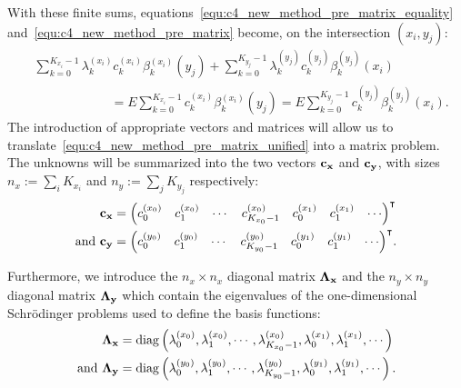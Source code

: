 With these finite sums, equations~\eqref{equ:c4_new_method_pre_matrix_equality} and~\eqref{equ:c4_new_method_pre_matrix} become, on the intersection $(x_i, y_j)$:
\begin{align}
     & \sum_{k=0}^{K_{x_i}-1} \lambda_k^{(x_i)} c_k^{(x_i)} \beta^{(x_i)}_k(y_j) + \sum_{k=0}^{K_{y_j}-1} \lambda_k^{(y_j)} c_k^{(y_j)} \beta_k^{(y_j)}(x_i)\nonumber                                  \\
     & \qquad\qquad\qquad     = E \sum_{k=0}^{K_{x_i}-1} c_k^{(x_i)} \beta_k^{(x_i)}(y_j) = E \sum_{k=0}^{K_{y_j}-1} c_k^{(y_j)} \beta_k^{(y_j)}(x_i) \text{.}\label{equ:c4_new_method_pre_matrix_unified}
\end{align}
The introduction of appropriate vectors and matrices will allow us to translate~\eqref{equ:c4_new_method_pre_matrix_unified} into a matrix problem. The unknowns will be summarized into the two vectors $\vb{c_x}$ and $\vb{c_y}$, with sizes $n_x := \sum_i K_{x_i}$ and $n_y := \sum_j K_{y_j}$ respectively:
\begin{align*}
    \vb{c_x}            & = {\begin{pmatrix} c_0^{(x_0)} & c_1^{(x_0)} & \cdots & c_{K_{x_0}-1}^{(x_0)} & c_0^{(x_1)} & c_1^{(x_1)} & \cdots \end{pmatrix}}^\intercal         \\
    \text{and }\vb{c_y} & = {\begin{pmatrix} c_0^{(y_0)} & c_1^{(y_0)} & \cdots & c_{K_{y_0}-1}^{(y_0)} & c_0^{(y_1)} & c_1^{(y_1)} & \cdots \end{pmatrix}}^\intercal\text{.}
\end{align*}

Furthermore, we introduce the $n_x \times n_x$ diagonal matrix $\vb{\Lambda_x}$ and the $n_y \times n_y$ diagonal matrix $\vb{\Lambda_y}$ which contain the eigenvalues of the one-dimensional Schrödinger problems used to define the basis functions:
\begin{align*}
    \vb{\Lambda_x}            & = \operatorname{diag}\left( \lambda_0^{(x_0)}, \lambda_1^{(x_0)}, \cdots, \lambda_{K_{x_0}-1}^{(x_0)}, \lambda_0^{(x_1)}, \lambda_1^{(x_1)}, \cdots \right)         \\
    \text{and }\vb{\Lambda_y} & = \operatorname{diag}\left( \lambda_0^{(y_0)}, \lambda_1^{(y_0)}, \cdots, \lambda_{K_{y_0}-1}^{(y_0)}, \lambda_0^{(y_1)}, \lambda_1^{(y_1)}, \cdots \right)\text{.} \\
\end{align*}

